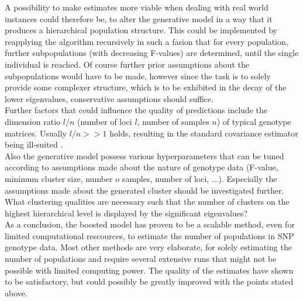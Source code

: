 \documentclass[a4paper, 11pt]{article}
\begin{document}
A possibility to make estimates more viable when dealing with real world instances could therefore be, to alter the generative model in a way that it produces a hierarchical population structure. This could be implemented by reapplying the algorithm recursively in such a fasion that for every population, further subpopulations (with decreasing F-values) are determined, until the single individual is reached. Of course further prior assumptions about the subpopulations would have to be made, however since the task is to solely provide some complexer structure, which is to be exhibited in the decay of the lower eigenvalues, conservative assumptions should suffice.\\
Further factors that could influence the quality of predictions include the dimension ratio $l/n$ (number of loci $l$, number of samples $n$) of typical genotype matrices. Usually $l/n >> 1$ holds, resulting in the standard covariance estimator being ill-suited \parencite{ledoit2004well, schafer2005shrinkage}.\\
Also the generative model possess various hyperparameters that can be tuned according to assumptions made about the nature of genotype data (F-value, minimum cluster size, number o samples, number of loci, ...). Especially the assumptions made about the generated cluster should be investigated further. What clustering qualities are necessary such that the number of clusters on the highest hierarchical level is displayed by the significant eigenvalues?\\
As a conclusion, the boosted model has proven to be a scalable method, even for limited computational rescources, to estimate the number of populations in SNP genotype data. Most other methods are very elaborate, for solely estimating the number of populations and require several extensive runs that might not be possible with limited computing power. The quality of the estimates have shown to be satisfactory, but could possibly be greatly improved with the points stated above.\\ 

\printbibliography
\end{document}
